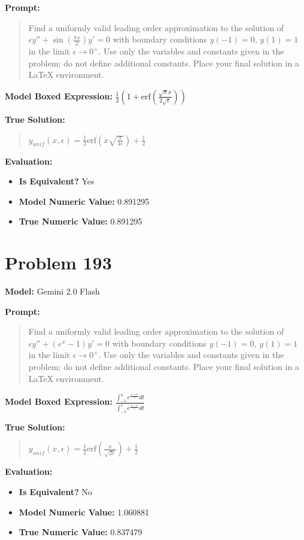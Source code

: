 \documentclass{article}
\begin{document}
{\textbf{Prompt:}
\begin{quote}
Find a uniformly valid leading order approximation to the solution of $\epsilon y'' + \sin\left(\frac{\pi x}{2}\right) y' = 0$ with boundary conditions $y(-1) = 0$, $y(1) = 1$ in the limit $\epsilon \to 0^+$. Use only the variables and constants given in the problem; do not define additional constants. Place your final solution in a $\boxed{}$ LaTeX environment.
\end{quote}
\textbf{Model Boxed Expression:} $\frac{1}{2}\left(1 + \text{erf}\left(\frac{\sqrt{\pi}x}{2\sqrt{\epsilon}}\right)\right)$

\textbf{True Solution:}
\begin{quote}
$y_{unif}(x, \epsilon) = \frac{1}{2} \text{erf}\left(x \sqrt{\frac{\pi}{4\epsilon}}\right) + \frac{1}{2}$
\end{quote}

\textbf{Evaluation:}
\begin{itemize}
\item \textbf{Is Equivalent?} Yes
\item \textbf{Model Numeric Value:} 0.891295
\item \textbf{True Numeric Value:} 0.891295
\end{itemize}
\vspace{1cm}
\section*{Problem 193}
\textbf{Model:} Gemini 2.0 Flash

\textbf{Prompt:}
\begin{quote}
Find a uniformly valid leading order approximation to the solution of $\epsilon y'' + (e^x - 1) y' = 0$ with boundary conditions $y(-1) = 0$, $y(1) = 1$ in the limit $\epsilon \to 0^+$. Use only the variables and constants given in the problem; do not define additional constants. Place your final solution in a $\boxed{}$ LaTeX environment.
\end{quote}
\textbf{Model Boxed Expression:} $\frac{\int_{-1}^x e^{\frac{1-e^t}{\epsilon}} dt}{\int_{-1}^1 e^{\frac{1-e^t}{\epsilon}} dt}$

\textbf{True Solution:}
\begin{quote}
$y_{unif}(x, \epsilon) = \frac{1}{2} \text{erf}\left(\frac{x}{\sqrt{2\epsilon}}\right) + \frac{1}{2}$
\end{quote}

\textbf{Evaluation:}
\begin{itemize}
\item \textbf{Is Equivalent?} No
\item \textbf{Model Numeric Value:} 1.060881
\item \textbf{True Numeric Value:} 0.837479
\end{itemize}
\vspace{1cm}
}
\end{document}
